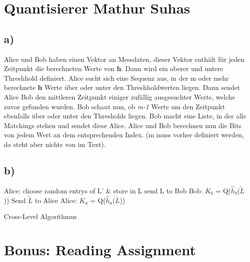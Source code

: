 \documentclass[12pt,a4paper]{article}
\begin{document}
\section{Quantisierer Mathur Suhas}
\subsection*{a)}
Alice und Bob haben einen Vektor an Messdaten, dieser Vektor enthält für jeden Zeitpunkt die berechneten Werte von \textbf{h}. Dann wird ein oberer und untere Threshhold definiert. Alice sucht sich eine Sequenz aus, in der m oder mehr berechnete \textbf{h} Werte über oder unter den Threshholdwerten liegen. Dann sendet Alice Bob den mittleren Zeitpunkt einiger zufällig ausgesuchter Werte, welche zuvor gefunden wurden. Bob schaut nun, ob \textit{m-1} Werte um den Zeitpunkt ebenfalls über oder unter den Thresholds liegen. Bob macht eine Liste, in der alle Matchings stehen und sendet diese Alice. Alice und Bob berechnen nun die Bits von jedem Wert an dem entsprechenden Index. (m muss vorher definiert werden, da steht aber nichts von im Text).
\subsection*{b)}
\begin{algorithm}[H]
\DontPrintSemicolon
\SetAlgoLined
{}
Alice:\;
choose random entrys of L' \& store in L\;
send L to Bob\;
Bob:\;
$K_b$ = Q($\hat{h}_b$($\tilde{L}$))\;
Send $\tilde{L}$ to Alice\;
Alice:\;
$K_a$ = Q($\hat{h}_a$($\tilde{L}$))\;
\caption{Cross-Level Algorithmus}
\end{algorithm}
\section{Bonus: Reading Assignment}
\end{document}
